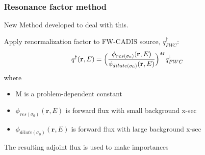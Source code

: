 \documentclass[xcolor=x11names,compress]{beamer}
\renewcommand{\(}{\begin{columns}}
\renewcommand{\)}{\end{columns}}
\newcommand{\<}[1]{\begin{column}{#1}}
\renewcommand{\>}{\end{column}}
\newcommand{\ve}[1]{\ensuremath{\mathbf{#1}}}
\newcommand{\micro}{\ensuremath{\sigma}}
\begin{document}
\begin{frame}[fragile]
  \frametitle{Resonance factor method \cite{Wilson2015}}
  
  \alert{New Method} developed to deal with this. 
  \vspace{0.5 em}
  
  	Apply renormalization factor to FW-CADIS source, $q^{\dagger}_{FWC}$: 
	\begin{equation}
   	q^{\dagger}(\ve{r},E) = \Bigl(\frac{\phi_{res(\micro_0)}(\ve{r},E)}{\phi_{dilute(\micro_0)}(\ve{r},E)}\Bigr)^M q^{\dagger}_{FWC}  \nonumber
  	 \label{eq:newQ}
	\end{equation}
	where
	\begin{itemize}
  	\item M is a problem-dependent constant 
 	 \item $\phi_{res(\micro_0)}(\ve{r},E)$ is forward flux with small background x-sec
 	 \item $\phi_{dilute(\micro_0)}(\ve{r},E)$ is forward flux with large background x-sec
	\end{itemize}

	\vspace*{1 em}
	The resulting adjoint flux is used to make importances
	
	
\end{frame}


%  
%	
%  
\end{document}
